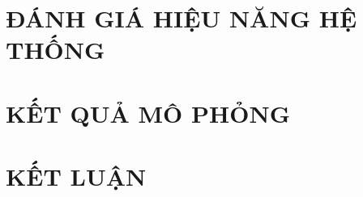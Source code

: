 \documentclass[10pt,conference,a4paper]{IEEEtran}
\begin{document}
%
\section{ĐÁNH GIÁ HIỆU NĂNG HỆ THỐNG}
\label{Sec:DanhGiaHieuNangHeThong}
%




%
\section{KẾT QUẢ MÔ PHỎNG}
\label{Sec:KetQuaMoPhong}
%

%
\section{KẾT LUẬN}
\label{Sec:KetLuan}
%


\balance

%
\end{document}
